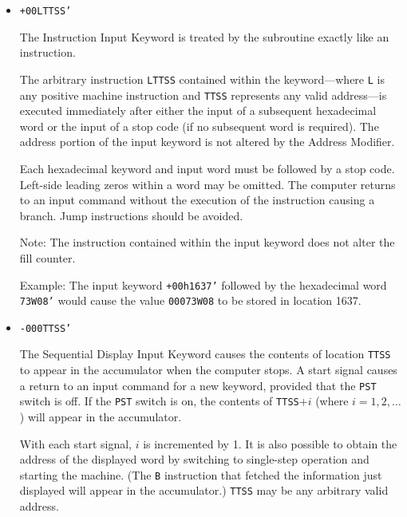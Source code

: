 \begin{itemize}
Each word can contain up to five characters in 6-bit representation (if more than five characters per word are entered, only the last five are retained). The last stored word receives a group-end indicator, i.e., $1$ at $q=30$. All characters except tape feed (blank tape), delete code, and stop code can be entered; for example, lowercase letters can be stored.

Example: The input keyword \texttt{A0000004'} followed by the four words \texttt{TOTAL' UNIT'S PRO'DUCED'} would cause the information \texttt{TOTAL UNITS PRODUCED} to be stored into four consecutive memory locations without conversion into binary.

\item \texttt{+00LTTSS'}

The Instruction Input Keyword is treated by the subroutine exactly like an instruction.

The arbitrary instruction \texttt{LTTSS} contained within the keyword—where \texttt{L} is any positive machine instruction and \texttt{TTSS} represents any valid address—is executed immediately after either the input of a subsequent hexadecimal word or the input of a stop code (if no subsequent word is required). The address portion of the input keyword is not altered by the Address Modifier.

Each hexadecimal keyword and input word must be followed by a stop code. Left-side leading zeros within a word may be omitted. The computer returns to an input command without the execution of the instruction causing a branch. Jump instructions should be avoided.

Note: The instruction contained within the input keyword does not alter the fill counter.

Example: The input keyword \texttt{+00h1637'} followed by the hexadecimal word \texttt{73W08'} would cause the value \texttt{00073W08} to be stored in location 1637.

\item \texttt{-000TTSS'}

The Sequential Display Input Keyword causes the contents of location \texttt{TTSS} to appear in the accumulator when the computer stops. A start signal causes a return to an input command for a new keyword, provided that the \texttt{PST} switch is off. If the \texttt{PST} switch is on, the contents of \texttt{TTSS$ + i$} (where $i = 1, 2, \dots$) will appear in the accumulator.

With each start signal, $i$ is incremented by 1. It is also possible to obtain the address of the displayed word by switching to single-step operation and starting the machine. (The \texttt{B} instruction that fetched the information just displayed will appear in the accumulator.) \texttt{TTSS} may be any arbitrary valid address.


\end{itemize}
